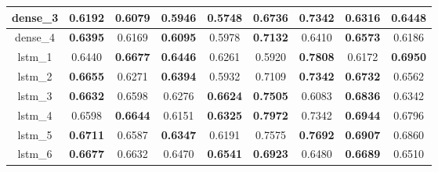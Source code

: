 \begin{table}[hp]
\begin{tabular} {|c|c|c|c|c|c|c|c|c| }
        dense\_3 & \textbf{0.6192}                     & 0.6079                              & \textbf{0.5946}                     & 0.5748                              & 0.6736                              & \textbf{0.7342}                     & 0.6316                              & \textbf{0.6448}                     \\ \hline
        dense\_4 & \textbf{0.6395}                     & 0.6169                              & \textbf{0.6095}                     & 0.5978                              & \textbf{0.7132}                     & 0.6410                              & \textbf{0.6573}                     & 0.6186                              \\ \hline
        lstm\_1  & 0.6440                              & \textbf{0.6677}                     & \textbf{0.6446}                     & 0.6261                              & 0.5920                              & \textbf{0.7808}                     & 0.6172                              & \textbf{\cellcolor{green!50}0.6950} \\ \hline
        lstm\_2  & \textbf{0.6655}                     & 0.6271                              & \textbf{0.6394}                     & 0.5932                              & 0.7109                              & \textbf{0.7342}                     & \textbf{0.6732}                     & 0.6562                              \\ \hline
        lstm\_3  & \textbf{0.6632}                     & 0.6598                              & 0.6276                              & \textbf{0.6624}                     & \textbf{0.7505}                     & 0.6083                              & \textbf{0.6836}                     & 0.6342                              \\ \hline
        lstm\_4  & 0.6598                              & \textbf{0.6644}                     & 0.6151                              & \textbf{0.6325}                     & \textbf{0.7972}                     & 0.7342                              & \textbf{\cellcolor{green!50}0.6944} & 0.6796                              \\ \hline
        lstm\_5  & \textbf{\cellcolor{green!50}0.6711} & 0.6587                              & \textbf{0.6347}                     & 0.6191                              & 0.7575                              & \textbf{0.7692}                     & \textbf{0.6907}                     & 0.6860                              \\ \hline
        lstm\_6  & \textbf{0.6677}                     & 0.6632                              & 0.6470                              & \textbf{0.6541}                     & \textbf{0.6923}                     & 0.6480                              & \textbf{0.6689}                     & 0.6510                              \\ \hline

\end{tabular}
\end{table}
